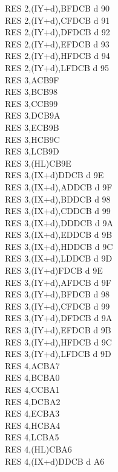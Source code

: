 \begin{multicols}{3}
{\begin{tabbing}
		RES 2,(IY+d),B\UNDOC\>FDCB d 90\\
		RES 2,(IY+d),C\UNDOC\>FDCB d 91\\
		RES 2,(IY+d),D\UNDOC\>FDCB d 92\\
		RES 2,(IY+d),E\UNDOC\>FDCB d 93\\
		RES 2,(IY+d),H\UNDOC\>FDCB d 94\\
		RES 2,(IY+d),L\UNDOC\>FDCB d 95\\
		RES 3,A\>CB9F\\
		RES 3,B\>CB98\\
		RES 3,C\>CB99\\
		RES 3,D\>CB9A\\
		RES 3,E\>CB9B\\
		RES 3,H\>CB9C\\
		RES 3,L\>CB9D\\
		RES 3,(HL)\>CB9E\\
		RES 3,(IX+d)\>DDCB d 9E\\
		RES 3,(IX+d),A\UNDOC\>DDCB d 9F\\
		RES 3,(IX+d),B\UNDOC\>DDCB d 98\\
		RES 3,(IX+d),C\UNDOC\>DDCB d 99\\
		RES 3,(IX+d),D\UNDOC\>DDCB d 9A\\
		RES 3,(IX+d),E\UNDOC\>DDCB d 9B\\
		RES 3,(IX+d),H\UNDOC\>DDCB d 9C\\
		RES 3,(IX+d),L\UNDOC\>DDCB d 9D\\
		RES 3,(IY+d)\>FDCB d 9E\\
		RES 3,(IY+d),A\UNDOC\>FDCB d 9F\\
		RES 3,(IY+d),B\UNDOC\>FDCB d 98\\
		RES 3,(IY+d),C\UNDOC\>FDCB d 99\\
		RES 3,(IY+d),D\UNDOC\>FDCB d 9A\\
		RES 3,(IY+d),E\UNDOC\>FDCB d 9B\\
		RES 3,(IY+d),H\UNDOC\>FDCB d 9C\\
		RES 3,(IY+d),L\UNDOC\>FDCB d 9D\\
		RES 4,A\>CBA7\\
		RES 4,B\>CBA0\\
		RES 4,C\>CBA1\\
		RES 4,D\>CBA2\\
		RES 4,E\>CBA3\\
		RES 4,H\>CBA4\\
		RES 4,L\>CBA5\\
		RES 4,(HL)\>CBA6\\
		RES 4,(IX+d)\>DDCB d A6\\

\end{tabbing}}
\end{multicols}
